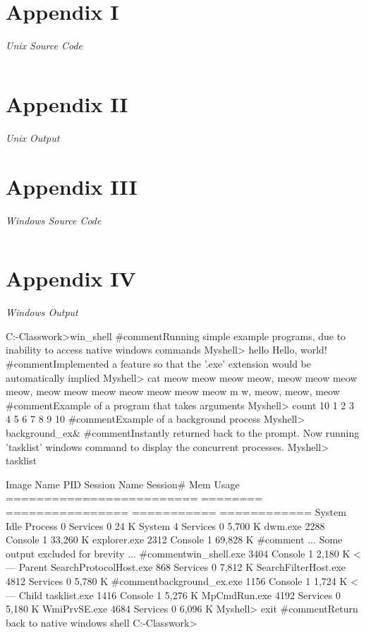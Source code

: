 \documentclass[12pt]{article}
\newcommand {\append}[2] {\section*{Appendix #1} \textsl{\large #2}}
\newcommand {\includesource}[2] {\inputminted[linenos, fontsize=\scriptsize, frame=lines]{#1}{#2}}
\begin{document}
\newpage

\append{I} {Unix Source Code}
\includesource{c}{unix_shell.c}


\append{II} {Unix Output}



\append{III} {Windows Source Code}
\includesource{c}{win_shell.c}


\append{IV} {Windows Output}
\begin{shelloutput}
C:\Users\Enrique\School\OS-Classwork>win_shell
#comment{Running simple example programs, due to inability to access native windows commands}
Myshell> hello
Hello, world!
#comment{Implemented a feature so that the '.exe' extension  would be automatically implied}
Myshell> cat
meow meow meow meow, meow meow meow meow, meow meow meow meow meow meow meow m
w, meow, meow, meow
#comment{Example of a program that takes arguments}
Myshell> count 10
1
2
3
4
5
6
7
8
9
10
#comment{Example of a background process}
Myshell> background_ex\&
#comment{Instantly returned back to the prompt. Now running 'tasklist' windows command to display the concurrent processes.}
Myshell> tasklist

Image Name                     PID Session Name        Session#    Mem Usage
========================= ======== ================ =========== ============
System Idle Process              0 Services                   0         24 K
System                           4 Services                   0      5,700 K
dwm.exe                       2288 Console                    1     33,260 K
explorer.exe                  2312 Console                    1     69,828 K
#comment{ ... Some output excluded for brevity ...}
#comment{win_shell.exe                 3404 Console                    1      2,180 K   <--- Parent}
SearchProtocolHost.exe         868 Services                   0      7,812 K
SearchFilterHost.exe          4812 Services                   0      5,780 K
#comment{background_ex.exe             1156 Console                    1      1,724 K   <--- Child}
tasklist.exe                  1416 Console                    1      5,276 K
MpCmdRun.exe                  4192 Services                   0      5,180 K
WmiPrvSE.exe                  4684 Services                   0      6,096 K
Myshell> exit
#comment{Return back to native windows shell}
C:\Users\Enrique\School\OS-Classwork>
\end{shelloutput}
\end{document}
